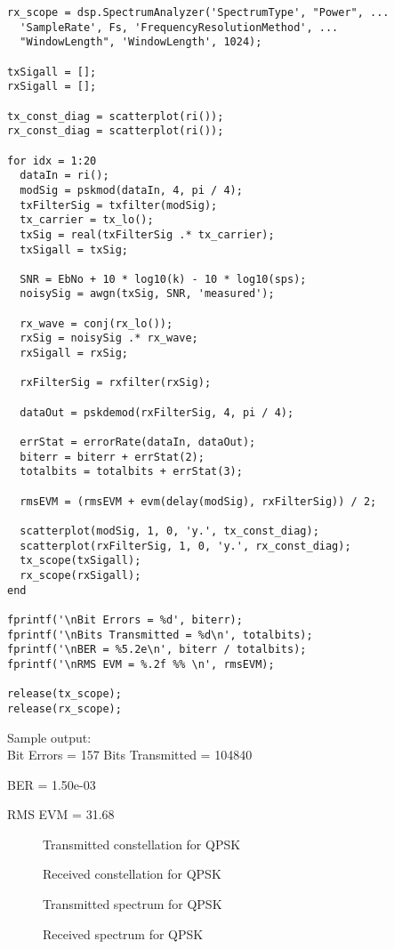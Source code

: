 \documentclass[a4paper]{article}
\begin{document}
\begin{verbatim}
rx_scope = dsp.SpectrumAnalyzer('SpectrumType', "Power", ...
  'SampleRate', Fs, 'FrequencyResolutionMethod', ...
  "WindowLength", 'WindowLength', 1024);

txSigall = [];
rxSigall = [];

tx_const_diag = scatterplot(ri());
rx_const_diag = scatterplot(ri());

for idx = 1:20
  dataIn = ri();
  modSig = pskmod(dataIn, 4, pi / 4);
  txFilterSig = txfilter(modSig);
  tx_carrier = tx_lo();
  txSig = real(txFilterSig .* tx_carrier);
  txSigall = txSig;

  SNR = EbNo + 10 * log10(k) - 10 * log10(sps);
  noisySig = awgn(txSig, SNR, 'measured');

  rx_wave = conj(rx_lo());
  rxSig = noisySig .* rx_wave;
  rxSigall = rxSig;

  rxFilterSig = rxfilter(rxSig);

  dataOut = pskdemod(rxFilterSig, 4, pi / 4);

  errStat = errorRate(dataIn, dataOut);
  biterr = biterr + errStat(2);
  totalbits = totalbits + errStat(3);

  rmsEVM = (rmsEVM + evm(delay(modSig), rxFilterSig)) / 2;

  scatterplot(modSig, 1, 0, 'y.', tx_const_diag);
  scatterplot(rxFilterSig, 1, 0, 'y.', rx_const_diag);
  tx_scope(txSigall);
  rx_scope(rxSigall);
end

fprintf('\nBit Errors = %d', biterr);
fprintf('\nBits Transmitted = %d\n', totalbits);
fprintf('\nBER = %5.2e\n', biterr / totalbits);
fprintf('\nRMS EVM = %.2f %% \n', rmsEVM);

release(tx_scope);
release(rx_scope);
\end{verbatim}

Sample output:\\

Bit Errors = 157
Bits Transmitted = 104840

BER = 1.50e-03

RMS EVM = 31.68 %

\begin{figure}[hbt!]
    \centering
  
  \caption{Transmitted constellation for QPSK}
\end{figure}
\begin{figure}[hbt!]
    \centering
  
  \caption{Received constellation for QPSK}
\end{figure}
\begin{figure}[hbt!]
    \centering
  
  \caption{Transmitted spectrum for QPSK}
\end{figure}
\begin{figure}[hbt!]
    \centering
  
  \caption{Received spectrum for QPSK}
\end{figure}
\end{document}
